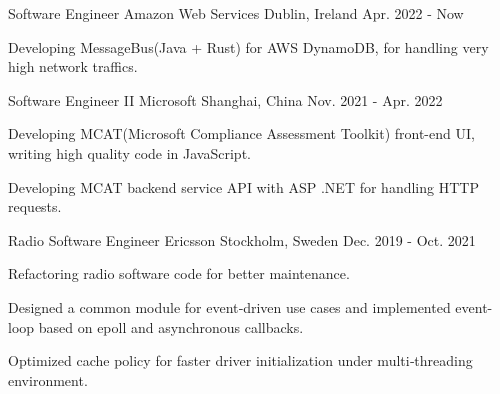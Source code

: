 

\begin{cventries}

\cventry
    {Software Engineer} %
    {Amazon Web Services} %
    {Dublin, Ireland} %
    {Apr. 2022 - Now} %
    {
      \begin{cvitems} %
        \item {Developing MessageBus(Java + Rust) for AWS DynamoDB, for handling very high network traffics.}
      \end{cvitems}
    }

\cventry
    {Software Engineer II} %
    {Microsoft} %
    {Shanghai, China} %
    {Nov. 2021 - Apr. 2022} %
    {
      \begin{cvitems} %
        \item {Developing MCAT(Microsoft Compliance Assessment Toolkit) front-end UI, writing high quality code in JavaScript.}
        \item {Developing MCAT backend service API with ASP .NET for handling HTTP requests.}
      \end{cvitems}
    }


 \cventry
    {Radio Software Engineer} %
    {Ericsson} %
    {Stockholm, Sweden} %
    {Dec. 2019 - Oct. 2021} %
    {
      \begin{cvitems} %
        \item {Refactoring radio software code for better maintenance.}
        \item {Designed a common module for event‐driven use cases and implemented event-loop based on epoll and asynchronous callbacks.}
        \item {Optimized cache policy for faster driver initialization under multi‐threading environment.}
      \end{cvitems}
    }


\end{cventries}
